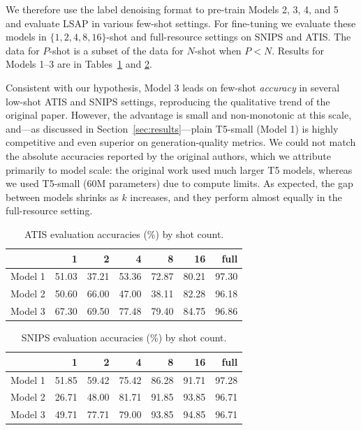 \documentclass[11pt]{article}
\begin{document}
We therefore use the label denoising format to pre-train Models 2, 3, 4, and
5 and evaluate LSAP in various few-shot settings. For fine-tuning we evaluate
these models in $\{1,2,4,8,16\}$-shot and full-resource settings on SNIPS and
ATIS. The data for $P$-shot is a subset of the data for $N$-shot when
$P<N$. Results for Models 1--3 are in Tables~\ref{tab:atis-eval} and
\ref{tab:snips-eval}.

Consistent with our hypothesis, Model 3 leads on few-shot \emph{accuracy} in
several low-shot ATIS and SNIPS settings, reproducing the qualitative trend
of the original paper. However, the advantage is small and non-monotonic at
this scale, and---as discussed in Section~\ref{sec:results}---plain T5-small
(Model 1) is highly competitive and even superior on generation-quality
metrics. We could not match the absolute accuracies reported by the original
authors, which we attribute primarily to model scale: the original work used
much larger T5 models, whereas we used T5-small (60M parameters) due to
compute limits. As expected, the gap between models shrinks as $k$ increases,
and they perform almost equally in the full-resource setting.

\begin{table}[t]
\centering
\small
\setlength{\tabcolsep}{4pt}
\begin{tabular}{lrrrrrr}
\toprule
 & 1 & 2 & 4 & 8 & 16 & full \\
\midrule
Model 1 & 51.03 & 37.21 & 53.36 & 72.87 & 80.21 & 97.30 \\
Model 2 & 50.60 & 66.00 & 47.00 & 38.11 & 82.28 & 96.18 \\
Model 3 & 67.30 & 69.50 & 77.48 & 79.40 & 84.75 & 96.86 \\
\bottomrule
\end{tabular}
\caption{ATIS evaluation accuracies (\%) by shot count.}
\label{tab:atis-eval}
\end{table}

\begin{table}[t]
\centering
\small
\setlength{\tabcolsep}{4pt}
\begin{tabular}{lrrrrrr}
\toprule
 & 1 & 2 & 4 & 8 & 16 & full \\
\midrule
Model 1 & 51.85 & 59.42 & 75.42 & 86.28 & 91.71 & 97.28 \\
Model 2 & 26.71 & 48.00 & 81.71 & 91.85 & 93.85 & 96.71 \\
Model 3 & 49.71 & 77.71 & 79.00 & 93.85 & 94.85 & 96.71 \\
\bottomrule
\end{tabular}
\caption{SNIPS evaluation accuracies (\%) by shot count.}
\label{tab:snips-eval}
\end{table}
\end{document}
